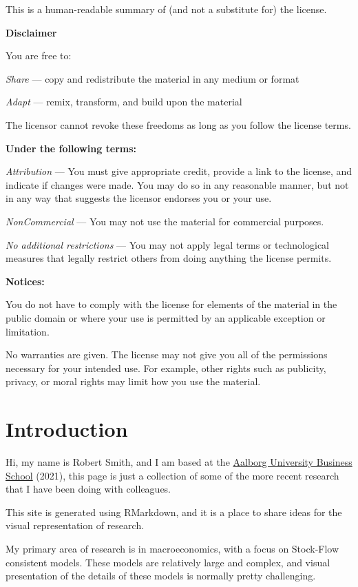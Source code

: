 \documentclass[
]{book}
\begin{document}
This is a human-readable summary of (and not a substitute for) the license.

\textbf{Disclaimer}

You are free to:

\emph{Share} --- copy and redistribute the material in any medium or format

\emph{Adapt} --- remix, transform, and build upon the material

The licensor cannot revoke these freedoms as long as you follow the license terms.

\textbf{Under the following terms:}

\emph{Attribution} --- You must give appropriate credit, provide a link to the license, and indicate if changes were made. You may do so in any reasonable manner, but not in any way that suggests the licensor endorses you or your use.

\emph{NonCommercial} --- You may not use the material for commercial purposes.

\emph{No additional restrictions} --- You may not apply legal terms or technological measures that legally restrict others from doing anything the license permits.

\textbf{Notices:}

You do not have to comply with the license for elements of the material in the public domain or where your use is permitted by an applicable exception or limitation.

No warranties are given. The license may not give you all of the permissions necessary for your intended use. For example, other rights such as publicity, privacy, or moral rights may limit how you use the material.

\hypertarget{introduction}{%
\chapter{Introduction}\label{introduction}}

Hi, my name is Robert Smith, and I am based at the \href{https://www.business.aau.dk}{Aalborg University Business School} (2021), this page is just a collection of some of the more recent research that I have been doing with colleagues.

This site is generated using RMarkdown, and it is a place to share ideas for the visual representation of research.

My primary area of research is in macroeconomics, with a focus on Stock-Flow consistent models. These models are relatively large and complex, and visual presentation of the details of these models is normally pretty challenging.
\end{document}
